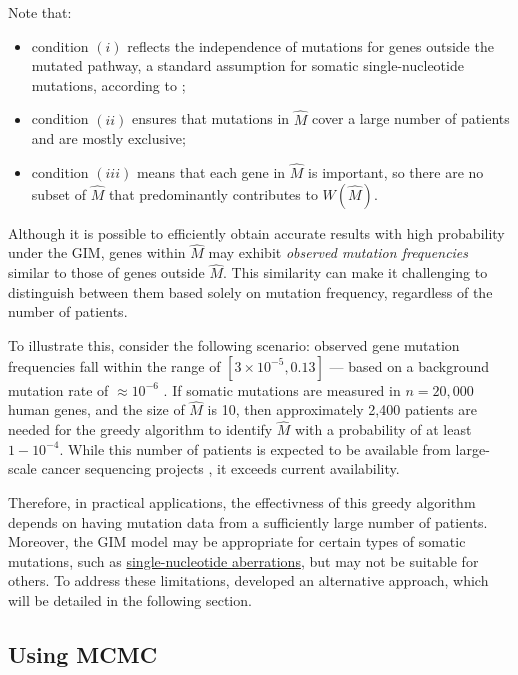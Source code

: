 Note that:

\begin{itemize}
    \item condition $(i)$ reflects the independence of mutations for genes outside the mutated pathway, a standard assumption for somatic single-nucleotide mutations, according to \textcite{dendrix};
    \item condition $(ii)$ ensures that mutations in $\hat M$ cover a large number of patients and are mostly exclusive;
    \item condition $(iii)$ means that each gene in $\hat M$ is important, so there are no subset of $\hat M$ that predominantly contributes to $W(\hat M)$.
\end{itemize}

Although it is possible to efficiently obtain accurate results with high probability under the GIM, genes within $\hat M$ may exhibit \textit{observed mutation frequencies} similar to those of genes outside $\hat M$. This similarity can make it challenging to distinguish between them based solely on mutation frequency, regardless of the number of patients.

To illustrate this, consider the following scenario: observed gene mutation frequencies fall within the range of $[3 \times 10^{-5}, 0.13]$ --- based on a background mutation rate of $\approx 10^{-6}$ \cite{tcga}. If somatic mutations are measured in $n = 20,000$ human genes, and the size of $\hat M$ is 10, then approximately 2,400 patients are needed for the greedy algorithm to identify $\hat M$ with a probability of at least $1 - 10^{-4}$. While this number of patients is expected to be available from large-scale cancer sequencing projects \cite{icgc}, it exceeds current availability.

Therefore, in practical applications, the effectivness of this greedy algorithm depends on having mutation data from a sufficiently large number of patients. Moreover, the GIM model may be appropriate for certain types of somatic mutations, such as \href{https://en.wikipedia.org/wiki/Single-nucleotide_polymorphism}{single-nucleotide aberrations}, but may not be suitable for others. To address these limitations, \textcite{dendrix} developed an alternative approach, which will be detailed in the following section.

\subsection{Using MCMC}

